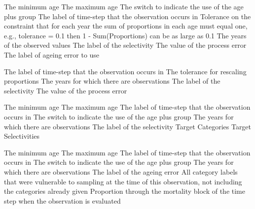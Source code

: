 \par\textbf{}\par
{} {The minimum age}
 {The maximum age}
 {The switch to indicate the use of the age plus group}
 {The label of time-step that the observation occurs in}
 {Tolerance on the constraint that for each year the sum of proportions in each age must equal one, e.g., tolerance = 0.1 then 1 - Sum(Proportions) can be as large as 0.1}
 {The years of the observed values}
 {The label of the selectivity}
 {The value of the process error}
 {The label of ageing error to use}

\par\textbf{}\par
{} {The label of time-step that the observation occurs in}
 {The tolerance for rescaling proportions}
 {The years for which there are observations}
 {The label of the selectivity}
 {The value of the process error}

\par\textbf{}\par
{} {The minimum age}
 {The maximum age}
 {The label of time-step that the observation occurs in}
 {The switch to indicate the use of the age plus group}
 {The years for which there are observations}
 {The label of the selectivity}
 {Target Categories}
 {Target Selectivities}

\par\textbf{}\par
{} {The minimum age}
 {The maximum age}
 {The label of time-step that the observation occurs in}
 {The switch to indicate the use of the age plus group}
 {The years for which there are observations}
 {The label of the ageing error}
 {All category labels that were vulnerable to sampling at the time of this observation, not including the categories already given}
 {Proportion through the mortality block of the time step when the observation is evaluated}

